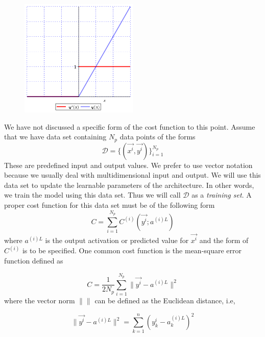 \documentclass[12pt]{article}
\begin{document}
\begin{flushleft}
\begin{enumerate}
 \begin{figure}[H]
  \centering
  \includegraphics[width=0.5\textwidth]{relu.png}
  \label{fig:relu}
\end{figure}

\end{enumerate}
\end{flushleft}


We have not discussed a specific form of the cost function to this point. Assume that we have data set containing $N_{p}$ data points of the forms 
\begin{equation}
\mathcal{D} = \{(\vec{x^{i}},\vec{y^{i}} )\}_{i=1}^{N_{p}}
\end{equation}
These are predefined input and output values. We prefer to use vector notation because we usually deal with multidimensional input and output. We will use this data set to update the learnable parameters of the architecture. In other words, we train the model using this data set. Thus we will call $\mathcal{D}$ as a \textit{training set}. A proper cost function for this data set must be of the following form 
\begin{equation}
\label{cf}
C = \sum_{i=1}^{N_{p}}C^{(i)}(\vec{y^{i}};a^{(i)L})
\end{equation}
where $a^{(i)L}$ is the output activation or predicted value for $\vec{x^{i}}$ and the form of $C^{(i)}$ is to be specified. One common cost function is the mean-square error  function defined as

\begin{equation}
\label{CF}
C = \dfrac{1}{2N_{p}}\sum_{i=1}^{N_{p}} \|  \vec{y^{i}}-a^{(i)L}   \|^{2}
\end{equation}
where the vector norm $\|  \|$ can be defined as the Euclidean distance, i.e, 

$$\|  \vec{y^{i}}-a^{(i)L}   \|^{2} = \sum_{k=1}^{n} (y^{i}_{k}-a^{(i)L}_{k})^{2}   $$
\end{document}
